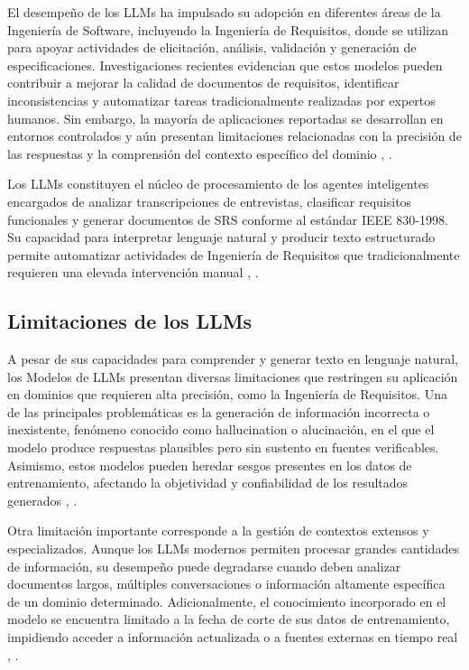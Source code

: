El desempeño de los LLMs ha impulsado su adopción en diferentes áreas de la Ingeniería de Software, incluyendo la Ingeniería de Requisitos, donde se 
utilizan para apoyar actividades de elicitación, análisis, validación y generación de especificaciones. Investigaciones recientes evidencian que estos 
modelos pueden contribuir a mejorar la calidad de documentos de requisitos, identificar inconsistencias y automatizar tareas tradicionalmente realizadas
por expertos humanos. Sin embargo, la mayoría de aplicaciones reportadas se desarrollan en entornos controlados y aún presentan limitaciones 
relacionadas con la precisión de las respuestas y la comprensión del contexto específico del dominio \cite{Umar2024}, \cite{khan2025large}.

Los LLMs constituyen el núcleo de procesamiento de los agentes inteligentes encargados de analizar transcripciones 
de entrevistas, clasificar requisitos funcionales y generar documentos de SRS conforme al estándar IEEE 830-1998. 
Su capacidad para interpretar lenguaje natural y producir texto estructurado permite automatizar actividades de Ingeniería de Requisitos que 
tradicionalmente requieren una elevada intervención manual \cite{Umar2024}, \cite{ellsel2025advancing}.


\subsection{Limitaciones de los LLMs}
A pesar de sus capacidades para comprender y generar texto en lenguaje natural, los Modelos de LLMs presentan diversas 
limitaciones que restringen su aplicación en dominios que requieren alta precisión, como la Ingeniería de Requisitos. Una de las principales 
problemáticas es la generación de información incorrecta o inexistente, fenómeno conocido como hallucination o alucinación, en el que el modelo 
produce respuestas plausibles pero sin sustento en fuentes verificables. Asimismo, estos modelos pueden heredar sesgos presentes en los datos de 
entrenamiento, afectando la objetividad y confiabilidad de los resultados generados \cite{ji2023survey}, \cite{rawte2023survey}.

Otra limitación importante corresponde a la gestión de contextos extensos y especializados. Aunque los LLMs modernos permiten procesar grandes 
cantidades de información, su desempeño puede degradarse cuando deben analizar documentos largos, múltiples conversaciones o información altamente 
específica de un dominio determinado. Adicionalmente, el conocimiento incorporado en el modelo se encuentra limitado a la fecha de corte de sus datos 
de entrenamiento, impidiendo acceder a información actualizada o a fuentes externas en tiempo real \cite{Guo2024}, \cite{hemmat2025research}.

